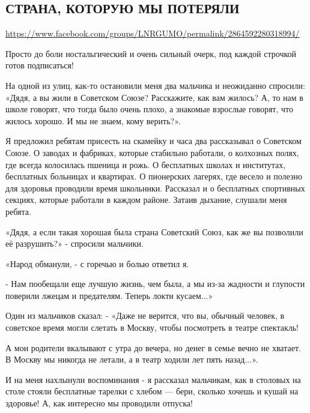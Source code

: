  
 
  
\subsection{СТРАНА, КОТОРУЮ МЫ ПОТЕРЯЛИ}
\label{sec:21_07_2020.fb.lnr.1}
\url{https://www.facebook.com/groups/LNRGUMO/permalink/2864592280318994/}


Просто до боли ностальгический и очень сильный очерк, под каждой строчкой готов
подписаться!

На одной из улиц, как-то остановили меня два мальчика и неожиданно спросили:
«Дядя, а вы жили в Советском Союзе? Расскажите, как вам жилось? А, то нам в
школе говорят, что тогда было очень плохо, а знакомые взрослые говорят, что
жилось хорошо. И мы не знаем, кому верить?».

Я предложил ребятам присесть на скамейку и часа два рассказывал о Советском
Союзе. О заводах и фабриках, которые стабильно работали, о колхозных полях, где
всегда колосилась пшеница и рожь. О бесплатных школах и институтах, бесплатных
больницах и квартирах.  О пионерских лагерях, где весело и полезно для здоровья
проводили время школьники. Рассказал и о бесплатных спортивных секциях, которые
работали в каждом районе.  Затаив дыхание, слушали меня ребята.

«Дядя, а если такая хорошая была страна Советский Союз, как же вы позволили её
разрушить?» - спросили мальчики.

«Народ обманули, - с горечью и болью ответил я.

- Нам пообещали еще лучшую жизнь, чем была, а мы из-за жадности и глупости
поверили лжецам и предателям. Теперь локти кусаем...»

Один из мальчиков сказал: - «Даже не верится, что вы, обычный человек, в
советское время могли слетать в Москву, чтобы посмотреть в театре спектакль!

А мои родители вкалывают с утра до вечера, но денег в семье вечно не хватает. В
Москву мы никогда не летали, а в театр ходили лет пять назад...».

И на меня нахлынули воспоминания - я рассказал мальчикам, как в столовых на
столе стояли бесплатные тарелки с хлебом --- бери, сколько хочешь и кушай на
здоровье! А, как интересно мы проводили отпуска!


